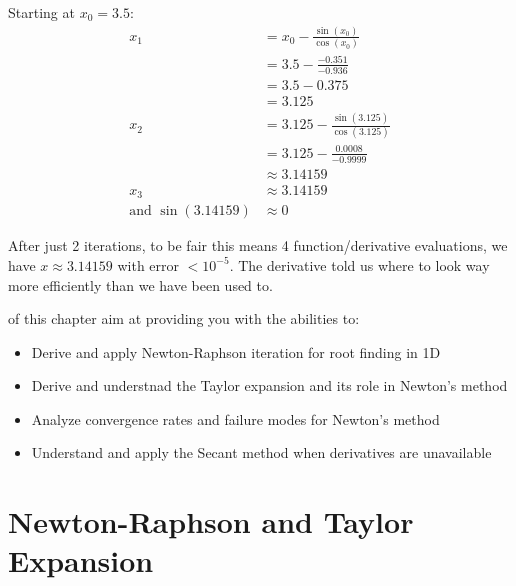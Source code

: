 Starting at $x_0 = 3.5$:
\begin{align*}
    x_1 &= x_0 - \frac{\sin(x_0)}{\cos(x_0)}\\
    &= 3.5 - \frac{-0.351}{-0.936} \\
    &= 3.5 - 0.375 \\
    &= 3.125 \\
    x_2 &= 3.125 - \frac{\sin(3.125)}{\cos(3.125)} \\
    &= 3.125 - \frac{0.0008}{-0.9999} \\
    &\approx 3.14159 \\
    x_3 &\approx 3.14159 \\
    \text{and } \sin(3.14159) &\approx 0
\end{align*}

After just 2 iterations, to be fair this means 4 function/derivative evaluations, we have $x \approx 3.14159$ with error $< 10^{-5}$.
The derivative told us where to look way more efficiently than we have been used to.


\vspace{2.5em}
 of this chapter aim at providing you with the abilities to:
\begin{itemize}
    \item Derive and apply Newton-Raphson iteration for root finding in 1D
    \item Derive and understnad the Taylor expansion and its role in Newton's method
    \item Analyze convergence rates and failure modes for Newton's method
    \item Understand and apply the Secant method when derivatives are unavailable
\end{itemize}




\newpage
\section{Newton-Raphson and Taylor Expansion}

